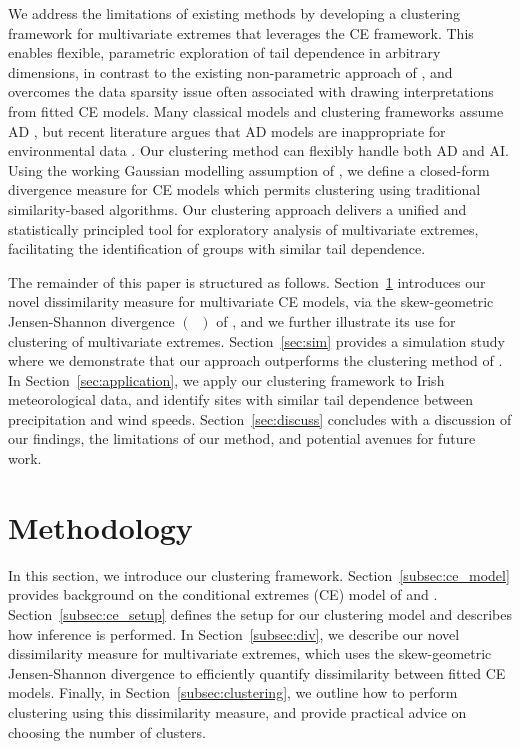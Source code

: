 \documentclass[preprint,12pt,authoryear]{elsarticle}
\newcommand{\JSGa}{\mathop{\mathrm{JS}^{\mathrm{G}_{\lambda}}}\nolimits}
\begin{document}
We address the limitations of existing methods by developing a clustering framework for multivariate extremes that leverages the CE framework. 
This enables flexible, parametric exploration of tail dependence in arbitrary dimensions, in contrast to the existing non-parametric approach of \citet{Vignotto2021}, and overcomes the data sparsity issue often associated with drawing interpretations from fitted CE models.
Many classical models and clustering frameworks assume AD \citep{Vignotto2021,Boulin2025}, but recent literature argues that AD models are inappropriate for environmental data \citep{Opitz2016,Dawkins2018,Huser2024}. 
Our clustering method can flexibly handle both AD and AI. 
Using the working Gaussian modelling assumption of \citet{Heffernan2004}, we define a closed-form divergence measure for CE models which permits clustering using traditional similarity-based algorithms. 
Our clustering approach delivers a unified and statistically principled tool for exploratory analysis of multivariate extremes, facilitating the identification of groups with similar tail dependence. 

The remainder of this paper is structured as follows.
Section~\ref{sec:method} introduces our novel dissimilarity measure for multivariate CE models, via the
skew-geometric Jensen-Shannon divergence $\left(\JSGa{}\right)$ of \citet{Nielsen2019}, and we further illustrate its use for clustering of multivariate extremes. 
Section~\ref{sec:sim} provides a simulation study where we demonstrate that our approach outperforms the clustering method of \citet{Vignotto2021}.
In Section~\ref{sec:application}, we apply our clustering framework to Irish meteorological data, and identify sites with similar tail dependence between precipitation and wind speeds.
Section~\ref{sec:discuss} concludes with a discussion of our findings, the limitations of our method, and potential avenues for future work. %

\section{Methodology}
\label{sec:method}

In this section, we introduce our clustering framework. 
Section~\ref{subsec:ce_model} provides background on the conditional extremes (CE) model of \citet{Heffernan2004} and \citet{Keef2013}.
Section~\ref{subsec:ce_setup} defines the setup for our clustering model and describes how inference is performed.
In Section~\ref{subsec:div}, we describe our novel dissimilarity measure for multivariate extremes, which uses the skew-geometric Jensen-Shannon divergence to efficiently quantify dissimilarity between fitted CE models.
Finally, in Section~\ref{subsec:clustering}, we outline how to perform clustering using this dissimilarity measure, and provide practical advice on choosing the number of clusters.
\end{document}
